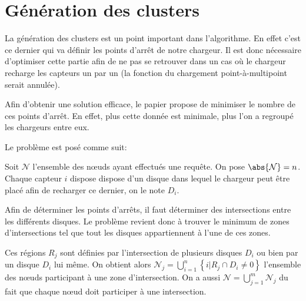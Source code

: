 \documentclass[noposter]{polytech}
\begin{document}
	\section{Génération des clusters}
		La génération des clusters est un point important dans l'algorithme.
		En effet c'est ce dernier qui va définir les points d'arrêt de notre chargeur.
		Il est donc nécessaire d'optimiser cette partie afin de ne pas se retrouver dans un cas où le chargeur recharge les capteurs un par un (la fonction du chargement point-à-multipoint serait annulée).
		
		Afin d'obtenir une solution efficace, le papier \cite{KHELLADI201744} propose de minimiser le nombre de ces points d'arrêt.
		 En effet, plus cette donnée est minimale, plus l'on a regroupé les chargeurs entre eux.
		 
		 Le problème est posé comme suit:
		 
		 Soit $\mathcal N$ l'ensemble des n\oe uds ayant effectués une requête. On pose $\abs{\mathcal N} = n$.
		 Chaque capteur $i$ dispose dispose d'un disque dans lequel le chargeur peut être placé afin de recharger ce dernier, on le note $D_i$.
		 
		 Afin de déterminer les points d'arrêts, il faut déterminer des intersections entre les différents disques.
		 Le problème revient donc à trouver le minimum de zones d'intersections tel que tout les disques appartiennent à l'une de ces zones.
		 
		 Ces régions $R_j$ sont définies par l'intersection de plusieurs disques $D_i$ ou bien par un disque $D_i$ lui même.
		 On obtient alors $\mathcal N_j=\bigcup_{i=1}^n\left\{i|R_j\cap D_i\neq 0\right\}$ l'ensemble des n\oe uds participant à une zone d'intersection.
		 On a aussi $\mathcal N=\bigcup_{j=1}^m\mathcal N_j$ du fait que chaque n\oe ud doit participer à une intersection.
\end{document}
